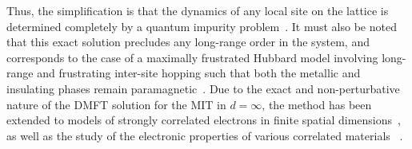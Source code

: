 Thus, the simplification is that the dynamics of any local site on the lattice is determined completely by a quantum impurity problem~\cite{georges1996,Logan_2015}.
It must also be noted that this exact solution precludes any long-range order in the system, and corresponds to the case of a maximally frustrated Hubbard model involving long-range and frustrating inter-site hopping such that both the metallic and insulating phases remain paramagnetic~\cite{vucicevic_2013}.
Due to the exact and non-perturbative nature of the DMFT solution for the MIT in \(d=\infty\), the method has been extended to models of strongly correlated electrons in finite spatial dimensions~\cite{park2008,rohringer_2018,maier_2005}, as well as the study of the electronic properties of various correlated materials ~\cite{lichenstein_1998,kotliar_2006,held_2007_ldadmft}.

